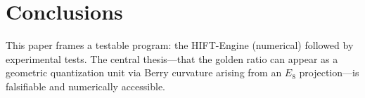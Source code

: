 \documentclass[11pt]{article}
\begin{document}
\section{Conclusions}
This paper frames a testable program: the HIFT-Engine (numerical) followed by experimental tests. The central thesis—that the golden ratio can appear as a geometric quantization unit via Berry curvature arising from an $E_8$ projection—is falsifiable and numerically accessible.
\end{document}
